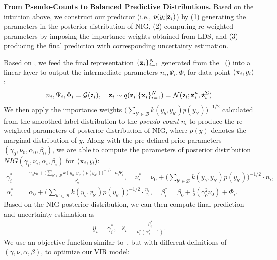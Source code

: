 \textbf{From Pseudo-Counts to Balanced Predictive Distributions.} {Based on the intuition above, we construct our predictor (i.e., $p(y_i|{\bf z}_i)$) by (1) generating the parameters in the posterior distribution of NIG, (2) computing re-weighted parameters by imposing the importance weights obtained from LDS, and (3) producing the final prediction with corresponding uncertainty estimation.}

Based on , we feed the final representation $\{ {\bf z}_i \}_{i=1}^{N}$ generated from the~ () into a linear layer to output the intermediate parameters $n_i, \Psi_i, \Phi_i$ for data point $({\bf x}_i,y_i)$:
%
\begin{align*}
n_i, \Psi_i, \Phi_i = {\mathcal G}({\bf z}_i), \quad {\bf z}_i \sim q({\bf z}_i|\{{\bf x}_i\}_{i=1}^N) = {\mathcal N}({\bf z}_i; \Tilde{{\bf z}}_i^{\mu}, \Tilde{{\bf z}}_i^{\Sigma})
\end{align*}
%
We then apply the importance weights $\big(\sum_{b' \in \mathcal{B}} k (y_b, y_{b'}) p(y_{b'})\big)^{-1/2}$ calculated from the smoothed label distribution to the \emph{pseudo-count} $n_i$ to produce the re-weighted parameters of posterior distribution of NIG, where $p(y)$ denotes the marginal distribution of $y$. Along with the pre-defined prior parameters $( \gamma_{0}, \nu_{0}, \alpha_{0}, \beta_{0} )$, we are able to compute the parameters of posterior distribution $NIG( \gamma_{i}, \nu_{i}, \alpha_{i}, \beta_{i} )$ for $({\bf x}_i,y_i)$:
%
\begin{align*}
\gamma_i^{*} &= \frac{\gamma_{0} \nu_{0} + \big(\sum_{b' \in \mathcal{B}} k (y_b, y_{b'}) p(y_{b'})\big)^{-1/2} \cdot n_i \Psi_i}{\nu_{n}^{*}}, \ \ \ \ \ 
\nu_{i}^{*} = \nu_{0} + \big(\sum_{b' \in \mathcal{B}} k (y_b, y_{b'}) p(y_{b'})\big)^{-1/2} \cdot n_i, \\
\alpha_{i}^{*} &= \alpha_{0} + \big(\sum_{b' \in \mathcal{B}} k (y_b, y_{b'}) p(y_{b'})\big)^{-1/2} \cdot \frac{n_i}{2},\ \ \ \ \ 
\beta_{i}^{*} = \beta_{0} + \frac{1}{2}(\gamma_{0}^{2} \nu_{0}) + \Phi_i.
\end{align*}
%
Based on the NIG posterior distribution, we can then compute final prediction and uncertainty estimation as
%
\begin{align*}
\hat{y}_i = \gamma_{i}^{*}, \ \ \ 
\hat{s}_i = \frac{\beta_{i}^{*}}{\nu_{i}^{*} (\alpha_{i}^{*} - 1)}.
\end{align*}
%
We use an objective function similar to~\eqnref{eq:DERnll}, but with different definitions of $(\gamma, \nu, \alpha, \beta)$, to optimize {our VIR model}:
%
\begingroup\makeatletter\def\f@size{8}\check@mathfonts
